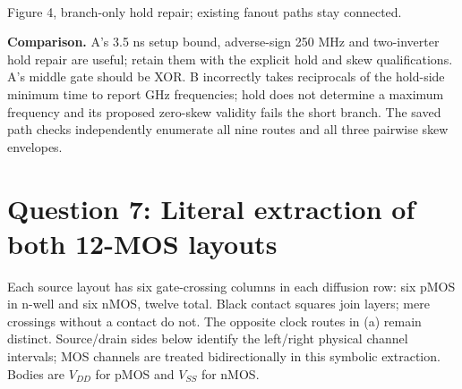 \documentclass[10pt]{article}
\begin{document}
\begin{center}
\\Figure 4, branch-only hold repair; existing fanout paths stay connected.\end{center}
\textbf{Comparison.} A's 3.5 ns setup bound, adverse-sign 250 MHz and two-inverter hold repair are useful; retain them with the explicit hold and skew qualifications. A's middle gate should be XOR. B incorrectly takes reciprocals of the hold-side minimum time to report GHz frequencies; hold does not determine a maximum frequency and its proposed zero-skew validity fails the short branch. The saved path checks independently enumerate all nine routes and all three pairwise skew envelopes.

\newpage\section*{Question 7: Literal extraction of both 12-MOS layouts}
Each source layout has six gate-crossing columns in each diffusion row: six pMOS in n-well and six nMOS, twelve total. Black contact squares join layers; mere crossings without a contact do not. The opposite clock routes in (a) remain distinct. Source/drain sides below identify the left/right physical channel intervals; MOS channels are treated bidirectionally in this symbolic extraction. Bodies are $V_{DD}$ for pMOS and $V_{SS}$ for nMOS.
\end{document}
